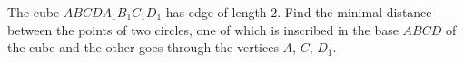 The cube $ABCDA_1B_1C_1D_1$ has edge of length $2$. Find the minimal distance between the points of two circles, one of which is inscribed in the base $ABCD$ of the cube and the other goes through the vertices $A$, $C$, $D_1$.
